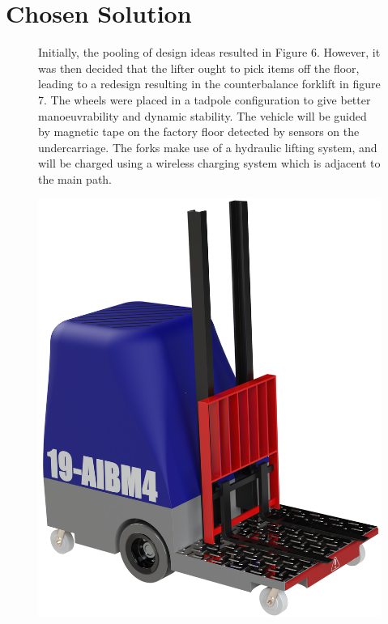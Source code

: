 \documentclass[12pt,titlepage]{article}
\begin{document}
\section{Chosen Solution}
\vspace{-20pt}
\begin{figure}[ht]
    \centering
    \begin{minipage}[t]{0.52\textwidth}
    \vspace{0pt}
        Initially, the pooling of design ideas resulted in Figure 6. However,
        it was then decided that the lifter ought to pick items off the floor, leading to a redesign resulting in the counterbalance forklift in figure 7. The wheels were placed in a tadpole configuration to give better manoeuvrability and dynamic stability. The vehicle will be guided by magnetic tape on the factory floor detected by sensors on the undercarriage. The forks make use of a hydraulic lifting system, and will be charged using a wireless charging system which is adjacent to the main path.
    \end{minipage}%
    \hfill
    \begin{minipage}[t]{0.22\textwidth}
        \vspace{10pt} 
        \centering
        \includegraphics[width=\linewidth]{Initial Pooled (4) Cropped.png}  

\end{minipage}
\end{figure}
\end{document}
